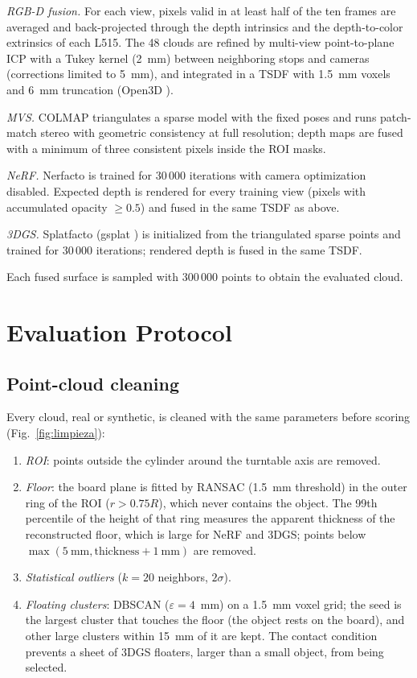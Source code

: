 \documentclass[journal]{IEEEtran}
\begin{document}
\emph{RGB-D fusion.} For each view, pixels valid in at least half of the ten frames are averaged and
back-projected through the depth intrinsics and the depth-to-color extrinsics of each L515. The 48 clouds
are refined by multi-view point-to-plane ICP \cite{besl1992icp} with a Tukey kernel (2~mm) between
neighboring stops and cameras (corrections limited to 5~mm), and integrated in a TSDF
\cite{curless1996volumetric} with 1.5~mm voxels and 6~mm truncation (Open3D \cite{zhou2018open3d}).

\emph{MVS.} COLMAP \cite{schoenberger2016sfm,schoenberger2016mvs} triangulates a sparse model with the fixed
poses and runs patch-match stereo with geometric consistency at full resolution; depth maps are fused with
a minimum of three consistent pixels inside the ROI masks.

\emph{NeRF.} Nerfacto \cite{tancik2023nerfstudio} is trained for 30\,000 iterations with camera optimization
disabled. Expected depth is rendered for every training view (pixels with accumulated opacity $\geq 0.5$)
and fused in the same TSDF as above.

\emph{3DGS.} Splatfacto (gsplat \cite{ye2024gsplat}) is initialized from the triangulated sparse points and
trained for 30\,000 iterations; rendered depth is fused in the same TSDF.

Each fused surface is sampled with 300\,000 points to obtain the evaluated cloud.

\section{Evaluation Protocol}
\subsection{Point-cloud cleaning}
Every cloud, real or synthetic, is cleaned with the same parameters before scoring
(Fig.~\ref{fig:limpieza}):
\begin{enumerate}
\item \emph{ROI}: points outside the cylinder around the turntable axis are removed.
\item \emph{Floor}: the board plane is fitted by RANSAC \cite{fischler1981ransac} (1.5~mm threshold) in the
outer ring of the ROI ($r > 0.75R$), which never contains the object. The 99th percentile of the height of
that ring measures the apparent thickness of the reconstructed floor, which is large for NeRF and 3DGS; points
below $\max(5~\text{mm}, \text{thickness} + 1~\text{mm})$ are removed.
\item \emph{Statistical outliers} ($k = 20$ neighbors, $2\sigma$).
\item \emph{Floating clusters}: DBSCAN \cite{ester1996dbscan} ($\varepsilon = 4$~mm) on a 1.5~mm voxel grid;
the seed is the largest cluster that touches the floor (the object rests on the board), and other large
clusters within 15~mm of it are kept. The contact condition prevents a sheet of 3DGS floaters, larger than a
small object, from being selected.
\end{enumerate}
\end{document}
